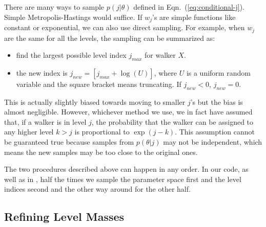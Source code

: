 \documentclass[letterpaper, preprint]{aastex}
\begin{document}
There are many ways to sample $p(j|\theta)$ defined in Eqn.~(\ref{eq:conditional-j}). Simple Metropolis-Hastings would suffice. \citep{brewer11a} If $w_j$'s are simple functions like constant or exponential, we can also use direct sampling. For example, when $w_j$ are the same for all the levels, the sampling can be summarized as:
\begin{sffamily}
\begin{itemize}
\item find the largest possible level index $j_{max}$ for walker $X$.
\item the new index is $j_{new} = [j_{max}+\log{(U)}]$, where $U$ is a uniform random variable and the square bracket means truncating. If $j_{new}<0$, $j_{new} = 0$.
\end{itemize}
\end{sffamily}
This is actually slightly biased towards moving to smaller $j$'s but the bias is almost negligible. However, whichever method we use, we in fact have assumed that, if a walker is in level $j$, the probability that the walker can be assigned to any higher level $k>j$ is proportional to $\exp(j-k)$. This assumption cannot be guaranteed true because samples from $p(\theta|j)$ may not be independent, which means the new samples may be too close to the original ones.

The two procedures described above can happen in any order. In our code, as well as in \citep{brewer11a}, half the times we sample the parameter space first and the level indices second and the other way around for the other half.

\subsection{Refining Level Masses}
\label{sec:refining-level-masses}
\end{document}
